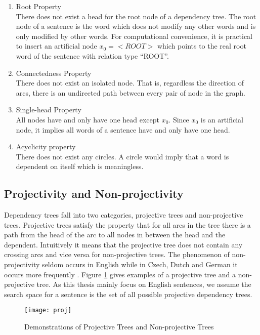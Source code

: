 \begin{enumerate}
\item  Root Property\\
There does not exist a head for the root node of a dependency tree. The root node of a sentence is the word which does not modify any other words and is only modified by other words. For computational convenience, it is practical to insert an artificial node $x_0=<ROOT>$ which points to the real root word of the sentence with relation type ``ROOT''. 
\item Connectedness Property\\
There does not exist an isolated node. That is, regardless the direction of arcs, there is an undirected path between every pair of node in the graph. 
\item Single-head Property\\
All nodes have and only have one head except $x_0$. Since $x_0$ is an artificial node, it implies all words of a sentence have and only have one head.
\item Acyclicity property\\
There does not exist any circles. A circle would imply that a word is dependent on itself which is meaningless.
\end{enumerate}

\subsection{Projectivity and Non-projectivity}
Dependency trees fall into two categories, projective trees and non-projective trees. 
Projective trees satisfy the property that for all arcs in the tree there is a path from the
head of the arc to all nodes in between the head and the dependent. Intuitively it means that
the projective tree does not contain any crossing arcs and vice versa for non-projective trees.
The phenomenon of non-projectivity seldom occurs in English while in Czech, Dutch and
German it occurs more frequently \cite{mcdonald2005online}. Figure \ref{fig:proj} gives examples of a projective tree and a non-projective tree. As this thesis mainly focus on English sentences, we assume the search space for a sentence is the set of all possible projective dependency trees.

\begin{figure}
  \centering
    \texttt{[image: proj]}
  \caption{Demonstrations of Projective Trees and Non-projective Trees}
  \label{fig:proj}
\end{figure}

